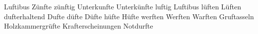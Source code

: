 \documentclass[12pt]{article}
\begin{document}
Luftibus 
Zünfte
zünftig
Unterkunfte
Unterkünfte
luftig
Luftibus
lüften
Lüften
dufterhaltend
Dufte
düfte
Düfte
hüfte
Hüfte
werften
Werften
Warften
Gruftasseln
Holzkammergrüfte
Krafterscheinungen
Notdurfte
\end{document}
